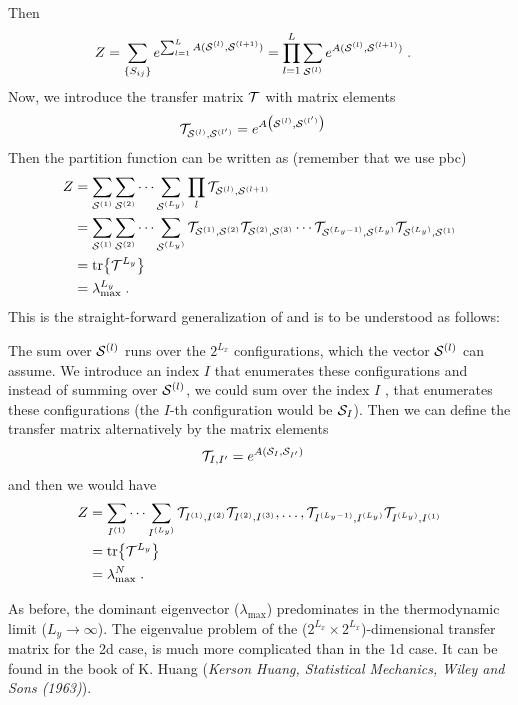 Then 
%
\begin{align*}
Z &= \sum_{\{S_{ij}\}} e^{\sum_{l=1}^{L} A({ \mathbf {\cal S}^{(l)}},{ \mathbf {\cal S}^{(l+1)}}) }
 = \prod_{l=1}^{L} \sum_{{ \mathbf {\cal S}^{(l)}}}  e^{ A({ \mathbf {\cal S}^{(l)}},{ \mathbf {\cal S}^{(l+1)}}) }\;.
\end{align*}
%
Now, we introduce the transfer matrix ${\cal T}$ with matrix elements
%
\begin{align*}
{\cal T}_{{ \mathbf {\cal S}^{(l)}},{ \mathbf {\cal S}^{(l')}}} &= e^{A\big({ \mathbf {\cal S}^{(l)}},{ \mathbf {\cal S}^{(l')}}\big)}
\end{align*}
%
Then the partition function can be written as (remember that we use pbc)
%
\begin{align*}
Z &= \sum_{{ \mathbf {\cal S}^{(1)}}} \sum_{{ \mathbf {\cal S}^{(2)}}}\cdots  \sum_{{ \mathbf {\cal S}^{(L_{y})}}}\prod_{l} {\cal T}_{{ \mathbf {\cal S}^{(l)}},{ \mathbf {\cal S}^{(l+1)}}}\\
&= \sum_{{ \mathbf {\cal S}^{(1)}}} \sum_{{ \mathbf {\cal S}^{(2)}}}\cdots  \sum_{{ \mathbf {\cal S}^{(L_{y})}}} {\cal T}_{{ \mathbf {\cal S}^{(1)}},{ \mathbf {\cal S}^{(2)}}}{\cal T}_{{ \mathbf {\cal S}^{(2)}},{ \mathbf {\cal S}^{(3)}}}\cdots {\cal T}_{{ \mathbf {\cal S}^{(L_{y}-1)}},{ \mathbf {\cal S}^{(L_{y})}}}
 {\cal T}_{{ \mathbf {\cal S}^{(L_{y})}},{ \mathbf {\cal S}^{(1)}}}\\
&= \tr{{\cal T}^{L_{y}}} \\
&= \lambda_\text{max}^{L_{y}}\;.
\end{align*}
%
This is the straight-forward generalization of 
and  is to be understood as follows: 

The sum over ${ \mathbf {\cal S}^{(l)}}$ runs over 
the $2^{L_{x}}$ configurations, which the vector ${ \mathbf {\cal S}^{(l)}}$ can assume. 
We introduce an index $I$ that enumerates these configurations and 
instead of summing over ${ \mathbf {\cal S}^{(l)}}$, we could sum over the index $I$ , that enumerates 
these configurations (the $I$-th configuration would be ${\cal S}_{I}$). Then we can define the transfer matrix alternatively by the matrix elements
\begin{align*}
{\cal T}_{I,I'} &= e^{A({\cal S}_{I}, {\cal S}_{I'})}
\end{align*}
%
and then we would have
%
\begin{align*}
Z &=  \sum_{I^{(1)}} \cdots  \sum_{I^{(L_{y})}} {\cal T}_{I^{(1)},I^{(2)}}
{\cal T}_{I^{(2)},I^{(3)}},\ldots,{\cal T}_{I^{(L_{y}-1)},I^{(L_{y})}}
{\cal T}_{I^{(L_{y})},I^{(1)}}\\
&= \tr{{\cal T}^{L_{y}}} \\
&= \lambda_\text{max}^{N}\;.
\end{align*}
%


%
As before, the dominant eigenvector ($\lambda_\text{max}$) predominates in the thermodynamic limit ($L_{y}\to \infty$). The eigenvalue problem
of the  ($2^{L_{x}}\times 2^{L_{x}}$)-dimensional transfer matrix for the 2d case, is much more complicated than  in the
1d case. It can be found in the book of K. Huang
({\em Kerson Huang, Statistical Mechanics, Wiley and Sons (1963)}).

